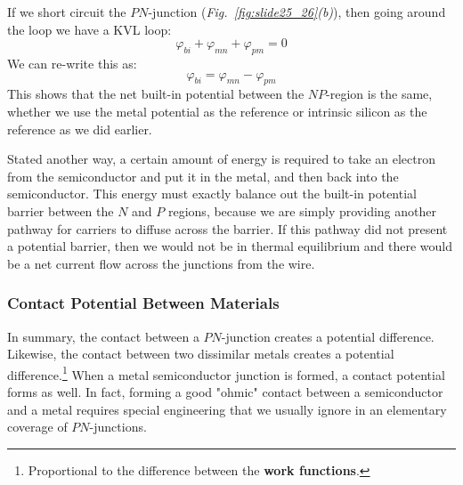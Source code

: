 If we short circuit the $PN$-junction \big(\emph{Fig.~\ref{fig:slide25_26}(b)}\big), then going around the loop we have a KVL loop:
    \begin{equation}
        \varphi_{bi} + \varphi_{mn} + \varphi_{pm} = 0
    \end{equation}
We can re-write this as:
    \begin{equation}
        \varphi_{bi} =  \varphi_{mn} - \varphi_{pm} 
    \end{equation}
This shows that the net built-in potential between the $NP$-region is the same, whether we use the metal potential as the reference or intrinsic silicon as the reference as we did earlier.  

Stated another way, a certain amount of energy is required to take an electron from the semiconductor and put it in the metal, and then back into the semiconductor.  This energy must exactly balance out the built-in potential barrier between the $N$ and $P$ regions, because we are simply providing another pathway for carriers to diffuse across the barrier.  If this pathway did not present a potential barrier,  then we would not be in thermal equilibrium and there would be a net current flow across the junctions from the wire.
\subsubsection{Contact Potential Between Materials}
In summary, the contact between a $PN$-junction creates a potential difference.    Likewise, the contact between two dissimilar metals creates a potential difference.\footnote{Proportional to the difference between the \textbf{work functions}.}   When a metal semiconductor junction is formed, a contact potential forms as well.  In fact, forming a good "ohmic" contact between a semiconductor and a metal requires special engineering that we usually ignore in an elementary coverage of $PN$-junctions.   
